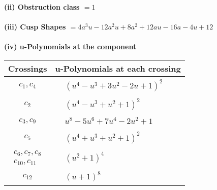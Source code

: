 \documentclass[1p]{elsarticle_modified}
\theoremstyle{definition}
\begin{document}
\flushleft \textbf{(ii) Obstruction class $= 1$}\\~\\
\flushleft \textbf{(iii) Cusp Shapes $= 4 a^3 u-12 a^2 u+8 a^2+12 a u-16 a-4 u+12$}\\~\\
\newpage\renewcommand{\arraystretch}{1}
\flushleft \textbf{(iv) u-Polynomials at the component}\newline \\
\begin{tabular}{m{50pt}|m{274pt}}
Crossings & \hspace{64pt}u-Polynomials at each crossing \\
\hline $$\begin{aligned}c_{1},c_{4}\end{aligned}$$&$\begin{aligned}
&(u^4- u^3+3 u^2-2 u+1)^2
\end{aligned}$\\
\hline $$\begin{aligned}c_{2}\end{aligned}$$&$\begin{aligned}
&(u^4- u^3+u^2+1)^2
\end{aligned}$\\
\hline $$\begin{aligned}c_{3},c_{9}\end{aligned}$$&$\begin{aligned}
&u^8-5 u^6+7 u^4-2 u^2+1
\end{aligned}$\\
\hline $$\begin{aligned}c_{5}\end{aligned}$$&$\begin{aligned}
&(u^4+u^3+u^2+1)^2
\end{aligned}$\\
\hline $$\begin{aligned}c_{6},c_{7},c_{8}\\c_{10},c_{11}\end{aligned}$$&$\begin{aligned}
&(u^2+1)^4
\end{aligned}$\\
\hline $$\begin{aligned}c_{12}\end{aligned}$$&$\begin{aligned}
&(u+1)^8
\end{aligned}$\\
\hline
\end{tabular}\\~\\
\end{document}
